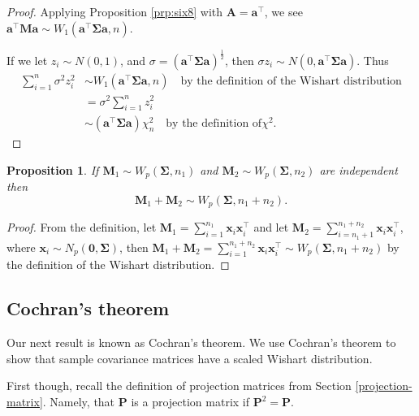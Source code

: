 \documentclass[
]{book}
\newtheorem{proposition}{Proposition}[chapter]
\theoremstyle{definition}
\theoremstyle{definition}
\theoremstyle{definition}
\theoremstyle{definition}
\theoremstyle{remark}
\begin{document}
\begin{proof}

Applying Proposition \ref{prp:six8} with \(\mathbf A= \mathbf a^\top\), we see \(\mathbf a^\top \mathbf M\mathbf a\sim W_1( \mathbf a^\top \boldsymbol{\Sigma}\mathbf a, n)\).

If we let \(z_i \sim N(0,1)\), and \(\sigma = (\mathbf a^\top \boldsymbol{\Sigma}\mathbf a)^\frac{1}{2}\), then \(\sigma z_i \sim N(0, \mathbf a^\top \boldsymbol{\Sigma}\mathbf a)\). Thus
\begin{align*}
\sum_{i=1}^n \sigma^2 z_i^2 &\sim W_1(\mathbf a^\top \boldsymbol{\Sigma}\mathbf a, n) \quad \mbox{by the definition of the Wishart distribution}\\
 &= \sigma^2 \sum_{i=1}^n z_i^2 \\
&\sim (\mathbf a^\top \boldsymbol{\Sigma}\mathbf a)\chi^2_n \quad \mbox{by the definition of} \chi^2.
\end{align*}

\end{proof}

\begin{proposition}
\protect\hypertarget{prp:six10}{}\label{prp:six10}If \(\mathbf M_1 \sim W_p(\boldsymbol{\Sigma},n_1)\) and \(\mathbf M_2 \sim W_p(\boldsymbol{\Sigma},n_2)\) are independent
then
\[\mathbf M_1 + \mathbf M_2 \sim W_p(\boldsymbol{\Sigma},n_1 + n_2).\]
\end{proposition}

\begin{proof}
From the definition, let \(\mathbf M_1 = \sum_{i=1}^{n_1} \mathbf x_i \mathbf x_i^\top\) and let \(\mathbf M_2 = \sum_{i=n_1+1}^{n_1+n_2} \mathbf x_i \mathbf x_i^\top\), where \(\mathbf x_i \sim N_p({\boldsymbol 0},\boldsymbol{\Sigma})\), then \(\mathbf M_1+\mathbf M_2 = \sum_{i=1}^{n_1+n_2} \mathbf x_i \mathbf x_i^\top \sim W_p(\boldsymbol{\Sigma},n_1 + n_2)\) by the definition of the Wishart distribution.
\end{proof}

\subsection{Cochran's theorem}\label{cochrans-theorem}

Our next result is known as Cochran's theorem. We use Cochran's theorem to show that sample covariance matrices have a scaled Wishart distribution.

First though, recall the definition of projection matrices from Section \ref{projection-matrix}. Namely, that \(\mathbf P\) is a projection matrix if \(\mathbf P^2=\mathbf P\).
\end{document}

